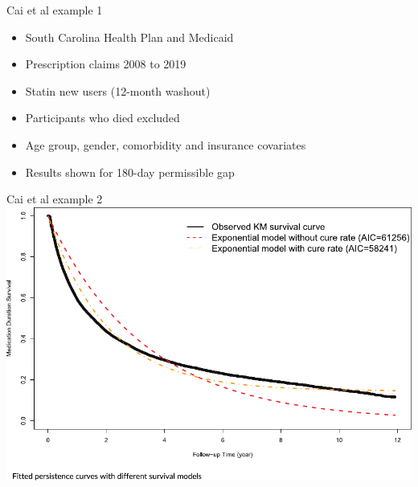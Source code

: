 \documentclass[aspectratio=169,12pt]{beamer} %
\begin{document}
\begin{frame}{Cai et al example 1}
	\begin{itemize}
		\item South Carolina Health Plan and Medicaid
		\item Prescription claims 2008 to 2019
		\item Statin new users (12-month washout)
		\item Participants who died excluded
		\item Age group, gender, comorbidity and insurance covariates
		\item Results shown for 180-day permissible gap
	\end{itemize}
\end{frame}

\begin{frame}{Cai et al example 2}
  \centering
  \includegraphics[height=0.7\textheight]{ref/cai_fig2.pdf}
\end{frame}
\end{document}
